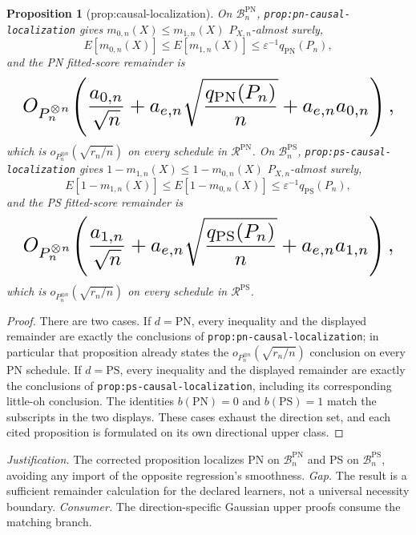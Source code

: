 \documentclass{article}
\newtheorem{proposition}{Proposition}
\begin{document}
\begin{proposition}[prop:causal-localization]\label{prop:causal-localization}
On \(\mathcal B_n^{\mathrm{PN}}\), \texttt{prop:pn-causal-localization} gives \(m_{0,n}(X)\le m_{1,n}(X)\) \(P_{X,n}\)-almost surely,
\[E[m_{0,n}(X)]\le E[m_{1,n}(X)]\le\varepsilon^{-1}q_{\mathrm{PN}}(P_n),\]
and the PN fitted-score remainder is
\[
\makebox[\linewidth][c]{\resizebox{0.98\linewidth}{!}{\par\noindent \makebox[\linewidth][c]{\resizebox{0.98\linewidth}{!}{\(\displaystyle \displaystyle O_{P_n^{\otimes n}}\!\left(\frac{a_{0,n}}{\sqrt n}+a_{e,n}\sqrt{\frac{q_{\mathrm{PN}}(P_n)}n}+a_{e,n}a_{0,n}\right),\)}}\par\noindent}}
\]
which is \(o_{P_n^{\otimes n}}(\sqrt{r_n/n})\) on every schedule in \(\mathcal R^{\mathrm{PN}}\). On \(\mathcal B_n^{\mathrm{PS}}\), \texttt{prop:ps-causal-localization} gives \(1-m_{1,n}(X)\le1-m_{0,n}(X)\) \(P_{X,n}\)-almost surely,
\[E[1-m_{1,n}(X)]\le E[1-m_{0,n}(X)]\le\varepsilon^{-1}q_{\mathrm{PS}}(P_n),\]
and the PS fitted-score remainder is
\[
\makebox[\linewidth][c]{\resizebox{0.98\linewidth}{!}{\par\noindent \makebox[\linewidth][c]{\resizebox{0.98\linewidth}{!}{\(\displaystyle \displaystyle O_{P_n^{\otimes n}}\!\left(\frac{a_{1,n}}{\sqrt n}+a_{e,n}\sqrt{\frac{q_{\mathrm{PS}}(P_n)}n}+a_{e,n}a_{1,n}\right),\)}}\par\noindent}}
\]
which is \(o_{P_n^{\otimes n}}(\sqrt{r_n/n})\) on every schedule in \(\mathcal R^{\mathrm{PS}}\).
\end{proposition}
\begin{proof}
There are two cases. If \(d=\mathrm{PN}\), every inequality and the displayed remainder are exactly the conclusions of \texttt{prop:pn-causal-localization}; in particular that proposition already states the \(o_{P_n^{\otimes n}}(\sqrt{r_n/n})\) conclusion on every PN schedule. If \(d=\mathrm{PS}\), every inequality and the displayed remainder are exactly the conclusions of \texttt{prop:ps-causal-localization}, including its corresponding little-oh conclusion. The identities \(b(\mathrm{PN})=0\) and \(b(\mathrm{PS})=1\) match the subscripts in the two displays. These cases exhaust the direction set, and each cited proposition is formulated on its own directional upper class.
\end{proof}
\par\smallskip\noindent \textit{Justification.} The corrected proposition localizes PN on \(\mathcal B_n^{\mathrm{PN}}\) and PS on \(\mathcal B_n^{\mathrm{PS}}\), avoiding any import of the opposite regression's smoothness. \textit{Gap.} The result is a sufficient remainder calculation for the declared learners, not a universal necessity boundary. \textit{Consumer.} The direction-specific Gaussian upper proofs consume the matching branch.
\end{document}
